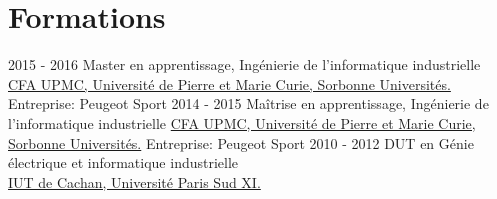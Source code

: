 \documentclass[letterpaper]{twentysecondcv} %
\begin{document}
\makeprofile %

\section{Formations}

\begin{twenty} %
	\twentyitem
    	{2015 - 2016}
        {Master en apprentissage, Ingénierie de l'informatique industrielle}
        {\href{http://www.upmc.fr/fr/universite.html}{CFA UPMC, Université de Pierre et Marie Curie, Sorbonne Universités.}}
        {Entreprise: Peugeot Sport}
        {}
	\twentyitem
    	{2014 - 2015}
        {Maîtrise en apprentissage, Ingénierie de l'informatique industrielle}
        {\href{http://www.upmc.fr/fr/universite.html}{CFA UPMC, Université de Pierre et Marie Curie, Sorbonne Universités.}}
        {Entreprise: Peugeot Sport}
        {}
	\twentyitem
    	{2010 - 2012}
        {DUT en Génie électrique et informatique industrielle}
        {\href{http://www.iut-cachan.u-psud.fr/fr/index.html}{\\IUT de Cachan, Université Paris Sud XI.}}
        {}
        {}       
\end{twenty}


\end{document}
